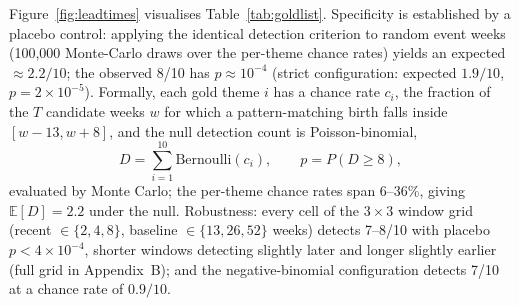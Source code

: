 \documentclass[a4paper,12pt]{report}
\begin{document}
Figure~\ref{fig:leadtimes} visualises Table~\ref{tab:goldlist}. Specificity is established by a placebo control: applying the identical
detection criterion to random event weeks (100{,}000 Monte-Carlo draws over
the per-theme chance rates) yields an expected $\approx 2.2/10$; the observed
8/10 has $p \approx 10^{-4}$ (strict configuration: expected $1.9/10$,
$p = 2\times10^{-5}$). Formally, each gold theme $i$ has a chance rate
$c_i$, the fraction of the $T$ candidate weeks $w$ for which a
pattern-matching birth falls inside $[w - 13, w + 8]$, and the null
detection count is Poisson-binomial,
\begin{equation}
D = \sum_{i=1}^{10} \mathrm{Bernoulli}(c_i), \qquad p = P(D \geq 8),
\label{eq:placebo}
\end{equation}
evaluated by Monte Carlo; the per-theme chance rates span 6--36\%, giving
$\mathbb{E}[D] = 2.2$ under the null. Robustness: every cell of the $3\times3$ window grid
(recent $\in \{2,4,8\}$, baseline $\in \{13,26,52\}$ weeks) detects 7--8/10
with placebo $p < 4\times10^{-4}$, shorter windows detecting slightly later
and longer slightly earlier (full grid in Appendix~B); and the
negative-binomial configuration detects 7/10 at a chance rate of $0.9/10$.
\end{document}
